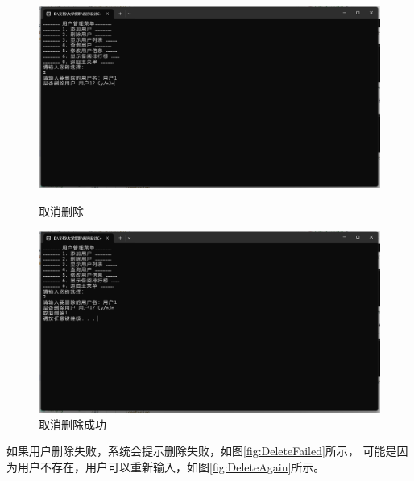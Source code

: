 \documentclass[12pt,twoside]{ctexart}
\begin{document}
\begin{figure}[H]
    \centering
    \begin{minipage}{0.48\textwidth}
        \centering
        \includegraphics[width=\linewidth]{nodeleteuser.png}
        \caption{取消删除}
        \label{fig:nodeleteuser}
    \end{minipage}\hfill
    \begin{minipage}{0.48\textwidth}
        \centering
        \includegraphics[width=\linewidth]{nodeleteusers.png}
        \caption{取消删除成功}
        \label{fig:nodeleteusers}
    \end{minipage}
\end{figure}

如果用户删除失败，系统会提示删除失败，如图\ref{fig:DeleteFailed}所示，
可能是因为用户不存在，用户可以重新输入，如图\ref{fig:DeleteAgain}所示。
\end{document}
